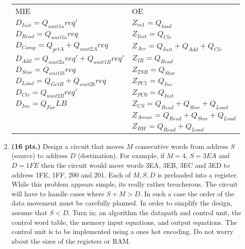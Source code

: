 \begin{enumerate}
\begin{onlysolution}
{                \begin{tabular}{ll}
                    MIE                                     &       OE                      \\
                    $D_{Init}= Q_{wait1a}req'$            &  $Z_{m1} = Q_{load}$           \\
                    $D_{Read } = Q_{wait1a}req$             &  $Z_{Init} = Q_{Clr}$           \\
                    $D_{Comp}= Q_{getA} + Q_{wait2A}req$  &  $Z_{Acc} = Q_{Init} + Q_{Add} + Q_{Clr}$               \\
                    $D_{Add}= Q_{wait2a}req' + Q_{wait1B}req'$   &  $Z_{IR} = Q_{Read}$     \\
                    $D_{Stor} = Q_{wait1b}req$             &  $Z_{TSB} = Q_{Stor}$         \\
                    $D_{Load}= Q_{GetB} + Q_{wait2b}req$  &  $Z_{PC1} = Q_{Inc}$          \\
                    $D_{Clr  } = Q_{wait2B}req'$            &  $Z_{PC0} = Q_{Init}$          \\
                    $D_{Inc } = Q_{For}LB$                 &   $Z_{CS} = Q_{Read}+Q_{Stor}+Q_{Load}$     \\
                    &   $Z_{Amux} = Q_{Read}+Q_{Stor}+Q_{Load}$   \\
                    &   $Z_{RW} = Q_{Read}+Q_{Load}$            \\
                \end{tabular}

            }
        \end{onlysolution}

    \item \textbf{ (16 pts.)}
        Design a circuit that moves $M$ consecutive words from address $S$ (source) to
        address $D$ (destination).  For example, if $M=4$, $S=3EA$ and $D=1FE$ then the
        circuit would move words 3EA, 3EB, 3EC and 3ED to address 1FE, 1FF, 200 and 201.
        Each of $M,S,D$ is preloaded into a register.  While this problem appears simple,
        its really rather treacherous.  The circuit will have to handle cases where
        $S+M > D$.  In such a case the order of the data movement must be carefully planned.
        In order to simplify the design, assume that $S<D$.
        Turn in; an algorithm the datapath and control unit, the control word
        table, the memory input equations, and output equations.
        The control unit is to be implemented using a ones hot encoding.
        Do not worry about the sizes of the
        registers or RAM.


\end{enumerate}
